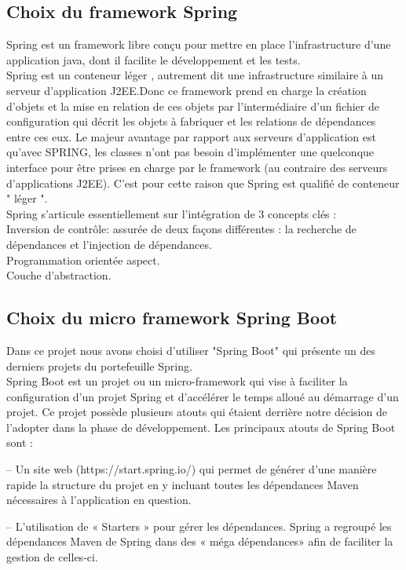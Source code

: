 \documentclass[a4paper,12pt,oneside]{report}
\begin{document}
\subsection{ Choix du framework Spring }
 Spring est un framework libre conçu pour  mettre en place l'infrastructure d'une application java, dont il facilite le développement et les tests. \\ Spring est un conteneur léger , autrement dit une infrastructure similaire à un serveur d'application J2EE.Donc ce framework prend en charge la création d'objets et la mise en relation de ces objets par l'intermédiaire d'un fichier de configuration qui décrit les objets à fabriquer et les relations de dépendances entre ces eux. Le majeur avantage par rapport aux serveurs d'application est qu'avec SPRING, les classes n'ont pas besoin d'implémenter une quelconque interface pour être prises en charge par le framework (au contraire des serveurs d’applications J2EE). C'est  pour cette raison que Spring est qualifié de conteneur " léger ". \\
Spring s'articule essentiellement sur l'intégration de 3 concepts clés :\\
Inversion de contrôle: assurée de deux façons différentes : la recherche de dépendances et l'injection de dépendances. \\
Programmation orientée aspect. \\
Couche d'abstraction.
\subsection{ Choix du micro framework Spring Boot}

Dans ce projet nous avons choisi d'utiliser "Spring Boot" qui présente un des derniers projets du portefeuille Spring.\\

Spring Boot  est un projet ou un micro-framework qui vise à faciliter la configuration d’un projet Spring et d’accélérer le temps alloué au démarrage d’un projet. Ce projet possède plusieurs atouts qui étaient derrière notre décision de l'adopter dans la phase de développement.
Les principaux atouts de Spring Boot sont :

– Un site web (https://start.spring.io/) qui permet de générer d'une manière rapide la structure du projet en y incluant toutes les dépendances Maven nécessaires à l'application en question.

– L'utilisation de « Starters » pour gérer les dépendances. Spring a regroupé les dépendances Maven de Spring dans des « méga dépendances» afin de faciliter la gestion de celles-ci.
\end{document}
